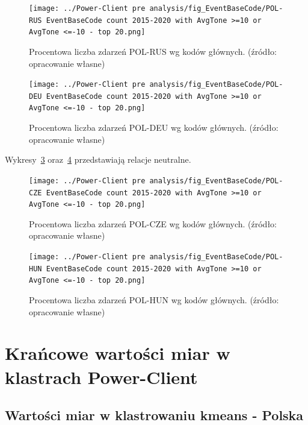 \documentclass[11pt]{report}
\begin{document}
    \begin{figure}[!htp]
        \centering
        \texttt{[image: ../Power-Client pre analysis/fig\_EventBaseCode/POL-RUS EventBaseCode count 2015-2020 with AvgTone >=10 or AvgTone <=-10 - top 20.png]}
        \caption{Procentowa liczba zdarzeń POL-RUS wg kodów głównych. (źródło: opracowanie własne)}
        \label{fig:Power-Client:EBC:AvgToone10:POL-RUS}
    \end{figure}

    \begin{figure}[!htp]
        \centering
        \texttt{[image: ../Power-Client pre analysis/fig\_EventBaseCode/POL-DEU EventBaseCode count 2015-2020 with AvgTone >=10 or AvgTone <=-10 - top 20.png]}
        \caption{Procentowa liczba zdarzeń POL-DEU wg kodów głównych. (źródło: opracowanie własne)}
        \label{fig:Power-Client:EBC:AvgToone10:POL-DEU}
    \end{figure}

    Wykresy~\ref{fig:Power-Client:EBC:AvgToone10:POL-CZE} oraz~\ref{fig:Power-Client:EBC:AvgToone10:POL-HUN} przedstawiają relacje neutralne.

    \begin{figure}[!htp]
        \centering
        \texttt{[image: ../Power-Client pre analysis/fig\_EventBaseCode/POL-CZE EventBaseCode count 2015-2020 with AvgTone >=10 or AvgTone <=-10 - top 20.png]}
        \caption{Procentowa liczba zdarzeń POL-CZE wg kodów głównych. (źródło: opracowanie własne)}
        \label{fig:Power-Client:EBC:AvgToone10:POL-CZE}
    \end{figure}

    \begin{figure}[!htp]
        \centering
        \texttt{[image: ../Power-Client pre analysis/fig\_EventBaseCode/POL-HUN EventBaseCode count 2015-2020 with AvgTone >=10 or AvgTone <=-10 - top 20.png]}
        \caption{Procentowa liczba zdarzeń POL-HUN wg kodów głównych. (źródło: opracowanie własne)}
        \label{fig:Power-Client:EBC:AvgToone10:POL-HUN}
    \end{figure}


    \section{Krańcowe wartości miar w klastrach Power-Client}

    \subsection{Wartości miar w klastrowaniu kmeans - Polska}\label{subsec:wartości-miar-w-klastrowaniu-kmeans---polska}
\end{document}
